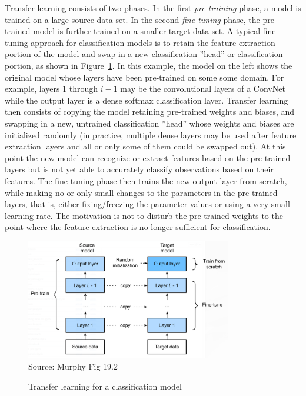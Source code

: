 Transfer learning consists of two phases. In the first \emph{pre-training} phase, a model is trained on a large source data set. In the second \emph{fine-tuning} phase, the pre-trained model is further trained on a smaller target data set. A typical fine-tuning approach for classification models is to retain the feature extraction portion of the model and swap in a new classification ''head'' or classification portion, as shown in Figure~\ref{fig:murphy_19_02}. In this example, the model on the left shows the original model whose layers have been pre-trained on some some domain. For example, layers $1$ through $i-1$ may be the convolutional layers of a ConvNet while the output layer is a dense softmax classification layer. Transfer learning then consists of copying the model retaining pre-trained weights and biases, and swapping in a new, untrained classification ''head'' whose weights and biases are initialized randomly (in practice, multiple dense layers may be used after feature extraction layers and all or only some of them could be swapped out). At this point the new model can recognize or extract features based on the pre-trained layers but is not yet able to accurately classify observations based on their features. The fine-tuning phase then trains the new output layer from scratch, while making no or only small changes to the parameters in the pre-trained layers, that is, either fixing/freezing the parameter values or using a very small learning rate. The motivation is not to disturb the pre-trained weights to the point where the feature extraction is no longer sufficient for classification. 

\begin{figure}
\begin{center}
\includegraphics[width=0.8\textwidth]{murphy_19_02.png} \\
\scriptsize Source: Murphy Fig 19.2 \normalsize
\end{center}
\caption{Transfer learning for a classification model}
\label{fig:murphy_19_02}
\end{figure}

